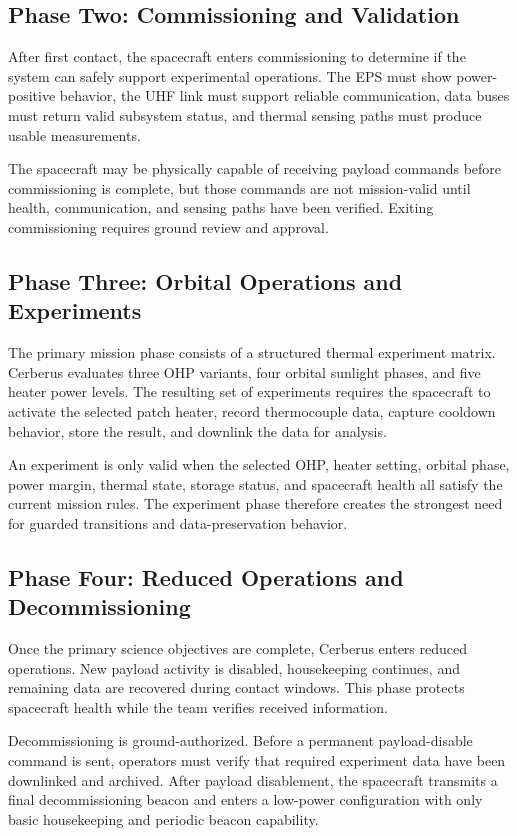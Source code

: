 \documentclass[10pt,letterpaper,twoside,fleqn]{article}
\newcommand{\Indent}{\hspace*{4\fontdimen2\font}}
\begin{document}
\subsection{Phase Two: Commissioning and Validation}

\Indent
After first contact, the spacecraft enters commissioning to determine if the system can safely support experimental operations. The EPS must show power-positive behavior, the UHF link must support reliable communication, data buses must return valid subsystem status, and thermal sensing paths must produce usable measurements.

The spacecraft may be physically capable of receiving payload commands before commissioning is complete, but those commands are not mission-valid until health, communication, and sensing paths have been verified. Exiting commissioning requires ground review and approval.

\subsection{Phase Three: Orbital Operations and Experiments}

\Indent
The primary mission phase consists of a structured thermal experiment matrix. Cerberus evaluates three OHP variants, four orbital sunlight phases, and five heater power levels. The resulting set of experiments requires the spacecraft to activate the selected patch heater, record thermocouple data, capture cooldown behavior, store the result, and downlink the data for analysis.

An experiment is only valid when the selected OHP, heater setting, orbital phase, power margin, thermal state, storage status, and spacecraft health all satisfy the current mission rules. The experiment phase therefore creates the strongest need for guarded transitions and data-preservation behavior.

\subsection{Phase Four: Reduced Operations and Decommissioning}

\Indent
Once the primary science objectives are complete, Cerberus enters reduced operations. New payload activity is disabled, housekeeping continues, and remaining data are recovered during contact windows. This phase protects spacecraft health while the team verifies received information.

Decommissioning is ground-authorized. Before a permanent payload-disable command is sent, operators must verify that required experiment data have been downlinked and archived. After payload disablement, the spacecraft transmits a final decommissioning beacon and enters a low-power configuration with only basic housekeeping and periodic beacon capability.
\end{document}
